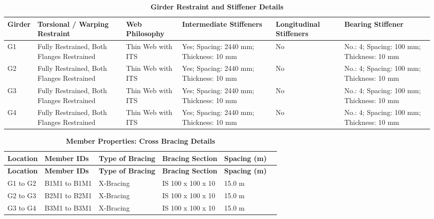 \documentclass[12pt,a4paper]{report}
\numberwithin{table}{chapter}
\numberwithin{figure}{chapter}
\begin{document}
\vspace{0.6em}

\vspace{4pt}
\begin{longtable}{|L{1.4cm}|p{2.2cm}|p{2.2cm}|p{3.0cm}|p{2.4cm}|p{2.2cm}|}
\caption{\textbf{Girder Restraint and Stiffener Details}}\\
\hline
\textbf{Girder} & \textbf{Torsional / Warping Restraint} & \textbf{Web Philosophy} & \textbf{Intermediate Stiffeners} & \textbf{Longitudinal Stiffeners} & \textbf{Bearing Stiffener} \\[6pt]
\hline
\endfirsthead
\endhead

G1 & Fully Restrained, Both Flanges Restrained & Thin Web with ITS & Yes; Spacing: 2440 mm; Thickness: 10 mm & No & No.: 4; Spacing: 100 mm; Thickness: 10 mm \\[8pt]
\hline
G2 & Fully Restrained, Both Flanges Restrained & Thin Web with ITS & Yes; Spacing: 2440 mm; Thickness: 10 mm & No & No.: 4; Spacing: 100 mm; Thickness: 10 mm \\[8pt]
\hline
G3 & Fully Restrained, Both Flanges Restrained & Thin Web with ITS & Yes; Spacing: 2440 mm; Thickness: 10 mm & No & No.: 4; Spacing: 100 mm; Thickness: 10 mm \\[8pt]
\hline
G4 & Fully Restrained, Both Flanges Restrained & Thin Web with ITS & Yes; Spacing: 2440 mm; Thickness: 10 mm & No & No.: 4; Spacing: 100 mm; Thickness: 10 mm \\[8pt]
\hline
\end{longtable}



\newpage

\vspace{0.4em}
\setlength{\tabcolsep}{4pt}
\setlength\LTleft{0pt}
\setlength\LTright{\fill}

\begin{longtable}{|L{2.2cm}|L{2.2cm}|L{3.0cm}|L{2.5cm}|C{1.8cm}|C{1.8cm}|}
\caption{\textbf{Member Properties: Cross Bracing Details}}
\hline
{} \textbf{Location} & \textbf{Member IDs} & \textbf{Type of Bracing} & \textbf{Bracing Section} & \textbf{Spacing (m)} \\
\hline
\endfirsthead
\hline
{} \textbf{Location} & \textbf{Member IDs} & \textbf{Type of Bracing} & \textbf{Bracing Section} & \textbf{Spacing (m)} \\
\hline
\endhead
G1 to G2 & B1M1 to B1M1 & X-Bracing & IS 100 x 100 x 10 & 15.0 m \\[6pt]
\hline
G2 to G3 & B2M1 to B2M1 & X-Bracing & IS 100 x 100 x 10 & 15.0 m \\[6pt]
\hline
G3 to G4 & B3M1 to B3M1 & X-Bracing & IS 100 x 100 x 10 & 15.0 m \\[6pt]
\hline
\end{longtable}
\end{document}
